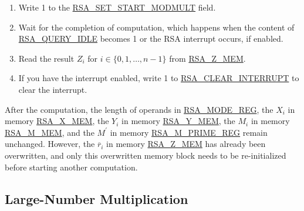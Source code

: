 \documentclass[main\_\_EN.tex]{subfiles}
\begin{document}
\begin{enumerate}
        Users need to write data to each memory block only according to the length of the number; data beyond this length is ignored.

    \item Write 1 to the \hyperref[fielddesc:RSASETSTARTMODMULT]{RSA\_SET\_START\_MODMULT} field.

    \item Wait for the completion of computation, which happens when the content of \hyperref[fielddesc:RSAQUERYIDLE]{RSA\_QUERY\_IDLE} becomes 1 or the RSA interrupt occurs, if enabled.

    \item Read the result \begin{math}Z_{i}\end{math} for \begin{math}i \in \{ 0, 1, \dots, n-1 \} \end{math} from \hyperref[regdesc:RSAmemory]{RSA\_Z\_MEM}.
    \item If you have the interrupt enabled, write 1 to \hyperref[fielddesc:RSACLEARINTERRUPT]{RSA\_CLEAR\_INTERRUPT} to clear the interrupt.

\end{enumerate}

After the computation, the length of operands in \hyperref[regdesc:RSAMODEREG]{RSA\_MODE\_REG}, the \begin{math}X_{i}\end{math} in memory \hyperref[regdesc:RSAmemory]{RSA\_X\_MEM}, the \begin{math}Y_{i}\end{math} in memory \hyperref[regdesc:RSAmemory]{RSA\_Y\_MEM}, the \begin{math}M_{i}\end{math} in memory \hyperref[regdesc:RSAmemory]{RSA\_M\_MEM}, and the \begin{math}M^{\prime}\end{math} in memory \hyperref[regdesc:RSAMPRIMEREG]{RSA\_M\_PRIME\_REG} remain unchanged. However, the \begin{math}\overline{r}_{i}\end{math} in memory \hyperref[regdesc:RSAmemory]{RSA\_Z\_MEM} has already been overwritten, and only this overwritten memory block needs to be re-initialized before starting another computation.

\subsection{Large-Number Multiplication}
\end{document}
